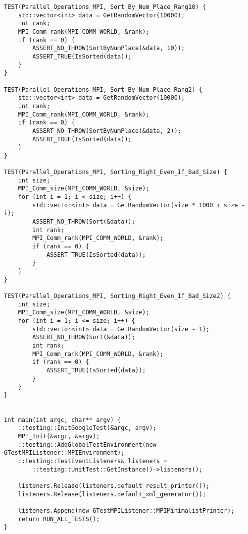 \documentclass{report}
\begin{document}
\begin{lstlisting}
TEST(Parallel_Operations_MPI, Sort_By_Num_Place_Rang10) {
    std::vector<int> data = GetRandomVector(10000);
    int rank;
    MPI_Comm_rank(MPI_COMM_WORLD, &rank);
    if (rank == 0) {
        ASSERT_NO_THROW(SortByNumPlace(&data, 10));
        ASSERT_TRUE(IsSorted(data));
    }
}

TEST(Parallel_Operations_MPI, Sort_By_Num_Place_Rang2) {
    std::vector<int> data = GetRandomVector(10000);
    int rank;
    MPI_Comm_rank(MPI_COMM_WORLD, &rank);
    if (rank == 0) {
        ASSERT_NO_THROW(SortByNumPlace(&data, 2));
        ASSERT_TRUE(IsSorted(data));
    }
}

TEST(Parallel_Operations_MPI, Sorting_Right_Even_If_Bad_Size) {
    int size;
    MPI_Comm_size(MPI_COMM_WORLD, &size);
    for (int i = 1; i < size; i++) {
        std::vector<int> data = GetRandomVector(size * 1000 + size - i);
        ASSERT_NO_THROW(Sort(&data));
        int rank;
        MPI_Comm_rank(MPI_COMM_WORLD, &rank);
        if (rank == 0) {
            ASSERT_TRUE(IsSorted(data));
        }
    }
}

TEST(Parallel_Operations_MPI, Sorting_Right_Even_If_Bad_Size2) {
    int size;
    MPI_Comm_size(MPI_COMM_WORLD, &size);
    for (int i = 1; i <= size; i++) {
        std::vector<int> data = GetRandomVector(size - 1);
        ASSERT_NO_THROW(Sort(&data));
        int rank;
        MPI_Comm_rank(MPI_COMM_WORLD, &rank);
        if (rank == 0) {
            ASSERT_TRUE(IsSorted(data));
        }
    }
}


int main(int argc, char** argv) {
    ::testing::InitGoogleTest(&argc, argv);
    MPI_Init(&argc, &argv);
    ::testing::AddGlobalTestEnvironment(new GTestMPIListener::MPIEnvironment);
    ::testing::TestEventListeners& listeners =
        ::testing::UnitTest::GetInstance()->listeners();

    listeners.Release(listeners.default_result_printer());
    listeners.Release(listeners.default_xml_generator());

    listeners.Append(new GTestMPIListener::MPIMinimalistPrinter);
    return RUN_ALL_TESTS();
}
\end{lstlisting}
\end{document}
